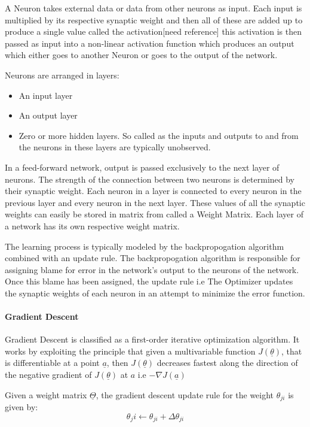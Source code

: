 \documentclass{article}
\begin{document}
A Neuron takes external data or data from other neurons as input. Each input is multiplied by its respective synaptic weight and then all of these are added up to produce a single value called the activation[need reference] this activation is then passed as input into a non-linear activation function which produces an output which either goes to another Neuron or goes to the output of the network.

Neurons are arranged in layers:
\begin{itemize}
	\item An input layer
	\item An output layer
	\item Zero or more hidden layers. So called as the inputs and outputs to and from the neurons in these layers are typically unobserved.
\end{itemize}
In a feed-forward network, output is passed exclusively to the next layer of neurons. The strength of the connection between two neurons is determined by their synaptic weight. Each neuron in a layer is connected to every neuron in the previous layer and every neuron in the next layer. These values of all the synaptic weights can easily be stored in matrix from called a Weight Matrix. Each layer of a network has its own respective weight matrix. 

The learning process is typically modeled by the backpropogation algorithm combined with an update rule. The backpropogation algorithm is responsible for assigning blame for error in the network's output to the neurons of the network. Once this blame has been assigned, the update rule i.e The Optimizer updates the synaptic weights of each neuron in an attempt to minimize the error function.

\paragraph{Gradient Descent}
Gradient Descent is classified as a first-order iterative optimization algorithm. It works by exploiting the principle that given a multivariable function $J(\underline\theta)$, that is differentiable at a point $\underline{a}$, then $J(\underline\theta)$ decreases fastest along the direction of the negative gradient of $J(\underline\theta)$ at $a$ i.e $-\nabla{J(\underline{a})}$
 
Given a weight matrix $\underline\Theta$, the gradient descent update rule for the weight $\theta_{ji}$ is given by:
\begin{equation}
\theta_ji \leftarrow \theta_{ji} + \Delta\theta_{ji}
\end{equation}
\end{document}
